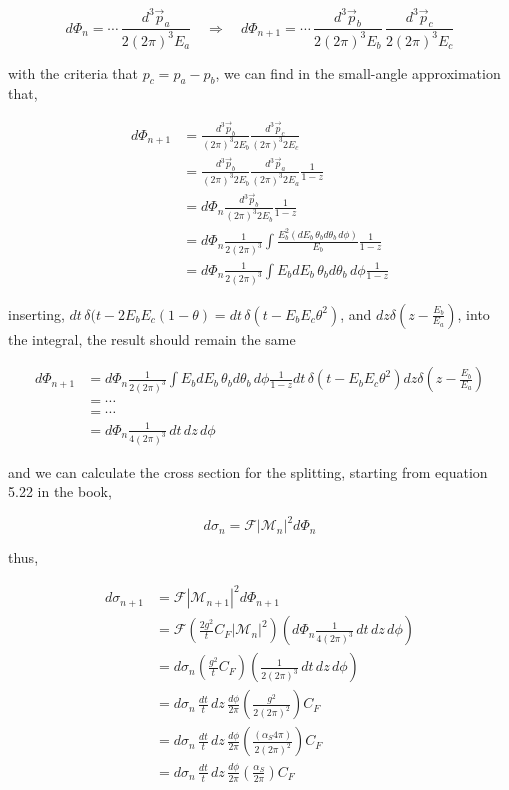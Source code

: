 \documentclass[main.tex]{subfiles}
\begin{document}
\[d\Phi_n = \cdots \, \frac{d^3 \vec p_a}{2(2\pi)^3 E_a} \quad \Rightarrow \quad d\Phi_{n+1} = \cdots \, \frac{d^3 \vec p_b}{2 (2\pi)^3 E_b} \, \frac{d^3 \vec p_c}{2(2\pi)^3 E_c}\]

 with the criteria that \(p_c = p_a - p_b\), we can find in the small-angle approximation that, 
 
 \begin{align*}
     d\Phi_{n+1} &= \frac{d^3 \vec p_b}{(2\pi)^3 2E_b} \frac{d^3 \vec p_c}{(2\pi)^3 2E_c} \\
     &=\frac{d^3 \vec p_b}{(2\pi)^3 2E_b} \frac{d^3 \vec p_a}{(2\pi)^3 2E_a} \frac{1}{1-z} \\
     &= d\Phi_n \frac{d^3 \vec p_b}{(2\pi)^3 2E_b} \frac{1}{1-z} \\
     &= d\Phi_n \frac{1}{2(2\pi)^3} \int\frac{E_b^2 (dE_b\, \theta_b d\theta_b \, d\phi )}{E_b} \frac{1}{1-z} \\
     &= d\Phi_n \frac{1}{2(2\pi)^3} \int E_b dE_b\, \theta_b d\theta_b \, d\phi \frac{1}{1-z}
 \end{align*}
 
 inserting, \(dt \, \delta( t-2E_bE_c(1-\theta) = dt \, \delta( t- E_bE_c \theta^2)\), and \(dz \delta(z- \frac{E_b}{E_a})\), into the integral, the result should remain the same
 
\begin{align*}
    d\Phi_{n+1} &= d\Phi_n \frac{1}{2(2\pi)^3} \int E_b dE_b\, \theta_b d\theta_b \, d\phi \frac{1}{1-z}  dt \, \delta( t- E_bE_c \theta^2) dz \delta(z- \frac{E_b}{E_a}) \\
    &= \cdots \\
    &= \cdots \\
    &= d\Phi_n \frac{1}{4 (2\pi)^3} \, dt\, dz \, d\phi 
\end{align*}

and we can calculate the cross section for the splitting, starting from equation 5.22 in the book,

\begin{equation*}
    d\sigma_n = \mathcal{F} |\mathcal{M}_n|^2 d\Phi_n
\end{equation*}

thus, 

\begin{align*}
    d\sigma_{n+1} &= \mathcal{F} |\mathcal{M}_{n+1}|^2 d\Phi_{n+1}\\
    &= \mathcal{F} \left( \frac{2g^2}{t} C_F|\mathcal{M}_n|^2 \right) \left( d\Phi_n \frac{1}{4 (2\pi)^3} \, dt\, dz \, d\phi  \right) \\
    &= d\sigma_n  \left( \frac{g^2}{t} C_F\right) \left( \frac{1}{2 (2\pi)^3} \, dt\, dz \, d\phi  \right) \\
    &= d\sigma_n \, \frac{dt}{t}\, dz \, \frac{d\phi}{2\pi} \left( \frac{g^2}{2(2\pi)^2} \right) C_F \\
    &= d\sigma_n \, \frac{dt}{t}\, dz \, \frac{d\phi}{2\pi} \left( \frac{(\alpha_S 4\pi)}{2(2\pi)^2} \right) C_F \\
    &= d\sigma_n \, \frac{dt}{t}\, dz \, \frac{d\phi}{2\pi} (\frac{\alpha_S }{2\pi} ) C_F
\end{align*}
\end{document}
